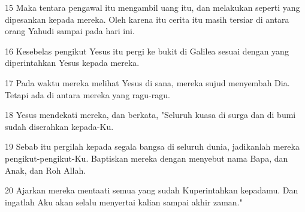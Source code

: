 \par 15 Maka tentara pengawal itu mengambil uang itu, dan melakukan seperti yang dipesankan kepada mereka. Oleh karena itu cerita itu masih tersiar di antara orang Yahudi sampai pada hari ini.
\par 16 Kesebelas pengikut Yesus itu pergi ke bukit di Galilea sesuai dengan yang diperintahkan Yesus kepada mereka.
\par 17 Pada waktu mereka melihat Yesus di sana, mereka sujud menyembah Dia. Tetapi ada di antara mereka yang ragu-ragu.
\par 18 Yesus mendekati mereka, dan berkata, "Seluruh kuasa di surga dan di bumi sudah diserahkan kepada-Ku.
\par 19 Sebab itu pergilah kepada segala bangsa di seluruh dunia, jadikanlah mereka pengikut-pengikut-Ku. Baptiskan mereka dengan menyebut nama Bapa, dan Anak, dan Roh Allah.
\par 20 Ajarkan mereka mentaati semua yang sudah Kuperintahkan kepadamu. Dan ingatlah Aku akan selalu menyertai kalian sampai akhir zaman."


